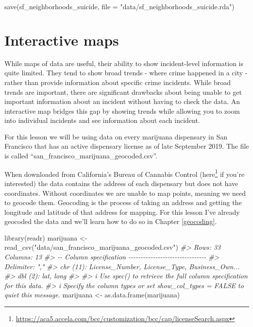\documentclass[
]{krantz}
\makeatletter
\newenvironment{Shaded}{\begin{snugshade}}{\end{snugshade}}
\newcommand{\AttributeTok}[1]{\textcolor[rgb]{0.61,0.61,0.61}{#1}}
\newcommand{\CommentTok}[1]{\textcolor[rgb]{0.37,0.37,0.37}{\textit{#1}}}
\newcommand{\FunctionTok}[1]{\textcolor[rgb]{0,0,0}{#1}}
\newcommand{\NormalTok}[1]{#1}
\newcommand{\OtherTok}[1]{\textcolor[rgb]{0.37,0.37,0.37}{#1}}
\newcommand{\StringTok}[1]{\textcolor[rgb]{0.5,0.5,0.5}{#1}}
\renewcommand{\href}[2]{#2\footnote{\url{#1}}}
\newenvironment{kframe}{%
\medskip{}
\setlength{\fboxsep}{.8em}
 \def\at@end@of@kframe{}%
 \ifinner\ifhmode%
  \def\at@end@of@kframe{\end{minipage}}%
  \begin{minipage}{\columnwidth}%
 \fi\fi%
 \def\FrameCommand##1{\hskip\@totalleftmargin \hskip-\fboxsep
 \colorbox{shadecolor}{##1}\hskip-\fboxsep
     \hskip-\linewidth \hskip-\@totalleftmargin \hskip\columnwidth}%
 \MakeFramed {\advance\hsize-\width
   \@totalleftmargin\z@ \linewidth\hsize
   \@setminipage}}%
 {\par\unskip\endMakeFramed%
 \at@end@of@kframe}
\renewenvironment{Shaded}{\begin{kframe}}{\end{kframe}}
\makeatother
\begin{document}
\begin{Shaded}
\begin{Highlighting}[]
\FunctionTok{save}\NormalTok{(sf\_neighborhoods\_suicide, }\AttributeTok{file =} \StringTok{"data/sf\_neighborhoods\_suicide.rda"}\NormalTok{)}
\end{Highlighting}
\end{Shaded}

\hypertarget{interactive-maps}{%
\chapter{Interactive maps}\label{interactive-maps}}

While maps of data are useful, their ability to show incident-level information is quite limited. They tend to show broad trends - where crime happened in a city - rather than provide information about specific crime incidents. While broad trends are important, there are significant drawbacks about being unable to get important information about an incident without having to check the data. An interactive map bridges this gap by showing trends while allowing you to zoom into individual incidents and see information about each incident.

For this lesson we will be using data on every marijuana dispensary in San Francisco that has an active dispensary license as of late September 2019. The file is called ``san\_francisco\_marijuana\_geocoded.csv''.

When downloaded from California's Bureau of Cannabis Control (\href{https://aca5.accela.com/bcc/customization/bcc/cap/licenseSearch.aspx}{here} if you're interested) the data contains the address of each dispensary but does not have coordinates. Without coordinates we are unable to map points, meaning we need to
geocode them. Geocoding is the process of taking an address and getting the longitude and latitude of that address for mapping. For this lesson I've already geocoded the data and we'll learn how to do so in Chapter \ref{geocoding}.

\begin{Shaded}
\begin{Highlighting}[]
\FunctionTok{library}\NormalTok{(readr)}
\NormalTok{marijuana }\OtherTok{\textless{}{-}} \FunctionTok{read\_csv}\NormalTok{(}\StringTok{"data/san\_francisco\_marijuana\_geocoded.csv"}\NormalTok{)}
\CommentTok{\#\textgreater{} Rows: 33 Columns: 13}
\CommentTok{\#\textgreater{} {-}{-} Column specification {-}{-}{-}{-}{-}{-}{-}{-}{-}{-}{-}{-}{-}{-}{-}{-}{-}{-}{-}{-}{-}{-}{-}{-}{-}{-}{-}{-}{-}{-}{-}{-}}
\CommentTok{\#\textgreater{} Delimiter: ","}
\CommentTok{\#\textgreater{} chr (11): License\_Number, License\_Type, Business\_Own...}
\CommentTok{\#\textgreater{} dbl  (2): lat, long}
\CommentTok{\#\textgreater{} }
\CommentTok{\#\textgreater{} i Use \textasciigrave{}spec()\textasciigrave{} to retrieve the full column specification for this data.}
\CommentTok{\#\textgreater{} i Specify the column types or set \textasciigrave{}show\_col\_types = FALSE\textasciigrave{} to quiet this message.}
\NormalTok{marijuana }\OtherTok{\textless{}{-}} \FunctionTok{as.data.frame}\NormalTok{(marijuana)}
\end{Highlighting}
\end{Shaded}
\end{document}
